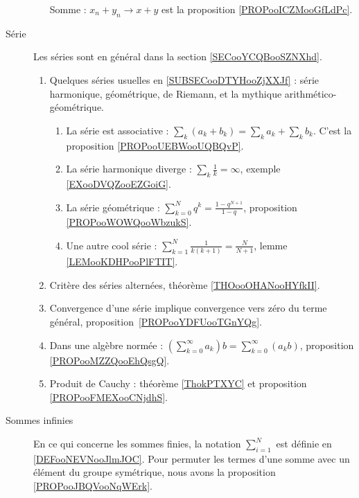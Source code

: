 \begin{description}
\begin{enumerate}
                Somme : \( x_n+y_n\to x+y\) est la proposition \ref{PROPooICZMooGfLdPc}.
        \end{enumerate}
    \item[Série] 
        Les séries sont en général dans la section \ref{SECooYCQBooSZNXhd}.
        \begin{enumerate}
    \item
        Quelques séries usuelles en \ref{SUBSECooDTYHooZjXXJf} : série harmonique, géométrique, de Riemann, et la mythique arithmético-géométrique.
        \begin{enumerate}
            \item
                La série est associative : \( \sum_k(a_k+b_k)=\sum_ka_k+\sum_kb_k\). C'est la proposition \ref{PROPooUEBWooUQBQvP}.
            \item
                La série harmonique diverge : \( \sum_k\frac{1}{ k }=\infty\), exemple \ref{EXooDVQZooEZGoiG}.
            \item
                La série géométrique : \( \sum_{k=0}^Nq^k=\frac{ 1-q^{N+1} }{ 1-q }\), proposition \ref{PROPooWOWQooWbzukS}.
            \item
                Une autre cool série : \( \sum_{k=1}^N\frac{ 1 }{ k(k+1) }=\frac{ N }{ N+1 }\), lemme \ref{LEMooKDHPooPlFTIT}.
        \end{enumerate}
    \item
        Critère des séries alternées, théorème \ref{THOooOHANooHYfkII}.
    \item
        Convergence d'une série implique convergence vers zéro du terme général, proposition~\ref{PROPooYDFUooTGnYQg}.
    \item
        Dans une algèbre normée : \( (\sum_{k=0}^{\infty}a_k)b=\sum_{k=0}^{\infty}(a_kb)\), proposition \ref{PROPooMZZQooEhQsgQ}.
    \item
        Produit de Cauchy : théorème \ref{ThokPTXYC} et proposition \ref{PROPooFMEXooCNjdhS}.
        \end{enumerate}

    \item[Sommes infinies]
        En ce qui concerne les sommes finies, la notation \( \sum_{i=1}^N\) est définie en \ref{DEFooNEVNooJlmJOC}. Pour permuter les termes d'une somme avec un élément du groupe symétrique, nous avons la proposition \ref{PROPooJBQVooNqWErk}.


\end{description}
